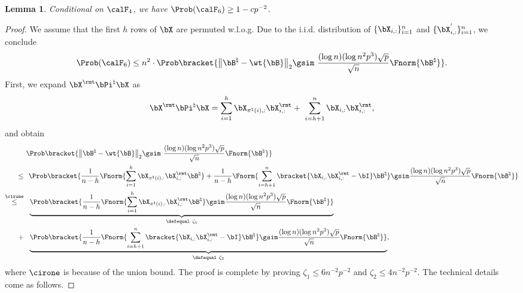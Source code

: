 \documentclass[11pt]{article}
\newtheorem{lemma}{Lemma}
\def \bPitrue {\bPi^{\natural}}
\def \bBtrue {\bB^{\natural}}
\begin{document}
\begin{lemma}
\label{lemma:Bmat_perturb}
Conditional on $\calF_4$,
we have $\Prob(\calF_6) \geq 1- c p^{-2}$.	
\end{lemma}
\begin{proof}
We assume that
the first $h$ rows of $\bX$ are permuted w.l.o.g.
Due to the i.i.d. distribution of
$\{\bX_{i, :}\}_{i=1}^n$ and $\{\bX^{'}_{i, :}\}_{i=1}^n$, we
conclude
\begin{align}
\label{eq:event6_tot}
\Prob(\calF_6) \leq
n^2 \cdot \Prob\bracket{\big\|\bBtrue - \wt{\bB}\big\|_{2}\gsim \
\frac{(\log n)(\log n^2 p^3)\sqrt{p}}{\sqrt{n}}\Fnorm{\bBtrue}}.
\end{align}
First, we expand $\bX^{\rmt}\bPitrue\bX$ as
\[
\bX^{\rmt}\bPitrue\bX =
\sum_{i=1}^h \bX_{\pi^{\natural}(i), :}\bX_{i, :}^{\rmt} + \
\sum_{i=h+1}^n \bX_{i, :}\bX_{i, :}^{\rmt},
\]
and obtain
\begin{align}
\label{eq:event6_tot_bernstein_tot}	
& \Prob\bracket{\big\|\bBtrue - \wt{\bB}\big\|_{2}\gsim \
\frac{(\log n)(\log n^2 p^3)\sqrt{p}}{\sqrt{n}}\Fnorm{\bBtrue} }\notag \\
\leq~& \
\Prob\bracket{\frac{1}{n-h}\Fnorm{\sum_{i=1}^h \bX_{\pi^{\natural}(i), :}\bX_{i, :}^{\rmt} \bBtrue } + \frac{1}{n-h}\Fnorm{\sum_{i=h+1}^n \bracket{\bX_{i, :}\bX^{\rmt} _{i, :} -\bI}\bBtrue}\gsim \frac{(\log n)(\log n^2 p^3)\sqrt{p}}{\sqrt{n}}\Fnorm{\bBtrue}  } \notag \\
\stackrel{\cirone}{\leq}~&\
\underbrace{\Prob\bracket{\frac{1}{n-h}\Fnorm{\sum_{i=1}^h \bX_{\pi^{\natural}(i), :}\bX^{\rmt}_{i, :} \bBtrue } \gsim    \frac{(\log n)(\log n^2 p^3)\sqrt{p}}{\sqrt{n}}\Fnorm{\bBtrue} } }_{\defequal~\zeta_1} \notag \\
+~& \
\underbrace{\Prob\bracket{\frac{1}{n-h}\Fnorm{\sum_{i=h+1}^n \bracket{\bX_{i, :} \bX_{i, :}^{\rmt} -\bI}\bBtrue}\gsim
\frac{(\log n)(\log n^2 p^3)\sqrt{p}}{\sqrt{n}}\Fnorm{\bBtrue}
 }}_{\defequal~\zeta_2},
\end{align}
where $\cirone$ is because of the union bound.
The proof is complete by
proving $\zeta_1 \leq 6n^{-2}p^{-2}$ and $\zeta_2 \leq 4n^{-2}p^{-2}$.
The technical details come as follows.


\end{proof}
\end{document}
